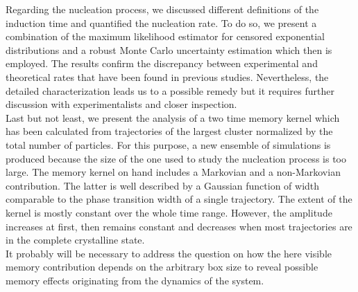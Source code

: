 Regarding the nucleation process, we discussed different definitions of the induction time and quantified the nucleation rate. To do so, we present a combination of the maximum likelihood estimator for censored exponential distributions and a robust Monte Carlo uncertainty estimation which then is employed. The results confirm the discrepancy between experimental and theoretical rates that have been found in previous studies. Nevertheless, the detailed characterization leads us to a possible remedy but it requires further discussion with experimentalists and closer inspection.\\

Last but not least, we present the analysis of a two time memory kernel which has been calculated from trajectories of the largest cluster normalized by the total number of particles. For this purpose, a new ensemble of simulations is produced because the size of the one used to study the nucleation process is too large. The memory kernel on hand includes a Markovian and a non-Markovian contribution. The latter is well described by a Gaussian function of width comparable to the phase transition width of a single trajectory. The extent of the kernel is mostly constant over the whole time range. However, the amplitude increases at first, then remains constant and decreases when most trajectories are in the complete crystalline state.\\
It probably will be necessary to address the question on how the here visible memory contribution depends on the arbitrary box size to reveal possible memory effects originating from the dynamics of the system.


